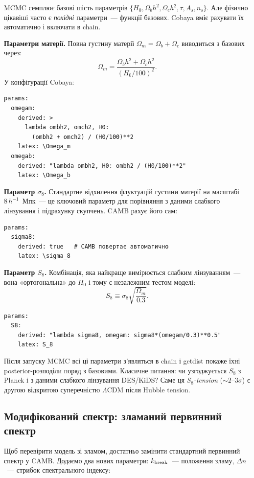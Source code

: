 MCMC семплює базові шість параметрів
$\{H_0, \Omega_b h^2, \Omega_c h^2, \tau, A_s, n_s\}$.
Але фізично цікавіші часто є \emph{похідні} параметри~---
функції базових. Cobaya вміє рахувати їх автоматично і
включати в chain.

\textbf{Параметри матерії.} Повна густину матерії
$\Omega_m = \Omega_b + \Omega_c$ виводиться з базових через:
\begin{equation}
  \Omega_m = \frac{\Omega_b h^2 + \Omega_c h^2}{(H_0/100)^2}.
\end{equation}
У конфігурації Cobaya:
\begin{verbatim}
params:
  omegam:
    derived: >
      lambda ombh2, omch2, H0:
        (ombh2 + omch2) / (H0/100)**2
    latex: \Omega_m
  omegab:
    derived: "lambda ombh2, H0: ombh2 / (H0/100)**2"
    latex: \Omega_b
\end{verbatim}

\textbf{Параметр $\sigma_8$.} Стандартне відхилення
флуктуацій густини матерії на масштабі $8\,h^{-1}$~Мпк~---
це ключовий параметр для порівняння з даними слабкого
лінзування і підрахунку скупчень. CAMB рахує його сам:
\begin{verbatim}
params:
  sigma8:
    derived: true   # CAMB повертає автоматично
    latex: \sigma_8
\end{verbatim}

\textbf{Параметр $S_8$.} Комбінація, яка найкраще
вимірюється слабким лінзуванням~--- вона «ортогональна»
до $H_0$ і тому є незалежним тестом моделі:
\begin{equation}
  S_8 \equiv \sigma_8\sqrt{\frac{\Omega_m}{0.3}}.
\end{equation}
\begin{verbatim}
params:
  S8:
    derived: "lambda sigma8, omegam: sigma8*(omegam/0.3)**0.5"
    latex: S_8
\end{verbatim}

Після запуску MCMC всі ці параметри з'являться в chain
і getdist покаже їхні posterior-розподіли поряд з базовими.
Класичне питання: чи узгоджується $S_8$ з Planck і з даними
слабкого лінзування DES/KiDS? Саме ця \emph{$S_8$-tension}
($\sim 2$--$3\sigma$) є другою відкритою суперечністю
$\Lambda$CDM після Hubble tension.

\subsection{Модифікований спектр: зламаний первинний спектр}

Щоб перевірити модель зі зламом, достатньо замінити стандартний
первинний спектр у CAMB. Додаємо два нових параметри:
$k_{\rm break}$~--- положення зламу, $\Delta n$~--- стрибок
спектрального індексу:

